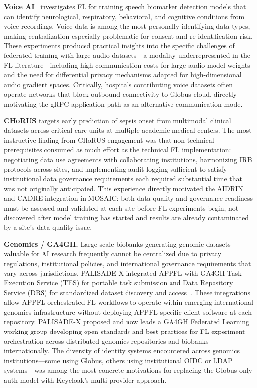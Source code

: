 \documentclass[conference]{IEEEtran}
\begin{document}
\textbf{Voice AI}~\cite{b2ai_voice_fl} investigates FL for training
speech biomarker detection models that can identify neurological,
respiratory, behavioral, and cognitive conditions from voice recordings.
Voice data is among the most personally identifying data types, making
centralization especially problematic for consent and re-identification
risk. These experiments produced practical insights into the specific
challenges of federated training with large audio datasets---a modality
underrepresented in the FL literature---including high communication
costs for large audio model weights and the need for differential
privacy mechanisms adapted for high-dimensional audio gradient spaces.
Critically, hospitals contributing voice datasets often operate networks
that block outbound connectivity to Globus cloud, directly motivating
the gRPC application path as an alternative communication mode.

\textbf{CHoRUS} targets early prediction of sepsis onset from
multimodal clinical datasets across critical care units at multiple
academic medical centers. The most instructive finding from CHoRUS
engagement was that non-technical prerequisites consumed as much effort
as the technical FL implementation: negotiating data use agreements
with collaborating institutions, harmonizing IRB protocols across sites,
and implementing audit logging sufficient to satisfy institutional data
governance requirements each required substantial time that was not
originally anticipated. This experience directly motivated the AIDRIN
and CADRE integration in MOSAIC: both data quality and governance
readiness must be assessed and validated at each site before FL
experiments begin, not discovered after model training has started and
results are already contaminated by a site's data quality issue.

\textbf{Genomics / GA4GH.} Large-scale biobanks generating genomic
datasets valuable for AI research frequently cannot be centralized due
to privacy regulations, institutional policies, and international
governance requirements that vary across jurisdictions. PALISADE-X
integrated APPFL with GA4GH Task Execution Service (TES) for portable
task submission and Data Repository Service (DRS) for standardized
dataset discovery and access~\cite{ga4gh}. These integrations allow
APPFL-orchestrated FL workflows to operate within emerging
international genomics infrastructure without deploying APPFL-specific
client software at each repository. PALISADE-X proposed and now leads
a GA4GH Federated Learning working group developing open standards and
best practices for FL experiment orchestration across distributed
genomics repositories and biobanks internationally. The diversity of
identity systems encountered across genomics institutions---some using
Globus, others using institutional OIDC or LDAP systems---was among
the most concrete motivations for replacing the Globus-only auth model
with Keycloak's multi-provider approach.
\end{document}
